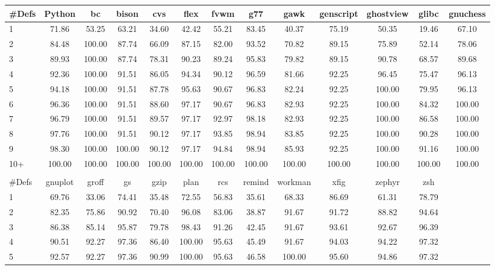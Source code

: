 \begin{tabular}{|l|c|c|c|c|c|c|c|c|c|c|c|c|}\hline
\#Defs & Python & bc & bison & cvs & flex & fvwm & g77 & gawk & genscript & ghostview & glibc & gnuchess\\\hline%
1  & 71.86 & 53.25 & 63.21 & 34.60 & 42.42 & 55.21 & 83.45 & 40.37 & 75.19 & 50.35 & 19.46 & 67.10\\\hline
2  & 84.48 & 100.00 & 87.74 & 66.09 & 87.15 & 82.00 & 93.52 & 70.82 & 89.15 & 75.89 & 52.14 & 78.06\\\hline
3  & 89.93 & 100.00 & 87.74 & 78.31 & 90.23 & 89.24 & 95.83 & 79.82 & 89.15 & 90.78 & 68.57 & 89.68\\\hline
4  & 92.36 & 100.00 & 91.51 & 86.05 & 94.34 & 90.12 & 96.59 & 81.66 & 92.25 & 96.45 & 75.47 & 96.13\\\hline
5  & 94.18 & 100.00 & 91.51 & 87.78 & 95.63 & 90.67 & 96.83 & 82.24 & 92.25 & 100.00 & 79.95 & 96.13\\\hline
6  & 96.36 & 100.00 & 91.51 & 88.60 & 97.17 & 90.67 & 96.83 & 82.93 & 92.25 & 100.00 & 84.32 & 100.00\\\hline
7  & 96.79 & 100.00 & 91.51 & 89.57 & 97.17 & 92.97 & 98.18 & 82.93 & 92.25 & 100.00 & 86.58 & 100.00\\\hline
8  & 97.76 & 100.00 & 91.51 & 90.12 & 97.17 & 93.85 & 98.94 & 83.85 & 92.25 & 100.00 & 90.28 & 100.00\\\hline
9  & 98.30 & 100.00 & 100.00 & 90.12 & 97.17 & 94.84 & 98.94 & 85.93 & 92.25 & 100.00 & 91.16 & 100.00\\\hline
10+ & 100.00 & 100.00 & 100.00 & 100.00 & 100.00 & 100.00 & 100.00 & 100.00 & 100.00 & 100.00 & 100.00 & 100.00\\\hline
\multicolumn{12}{c}{} \\
\cline{0-11}
\#Defs & gnuplot & groff & gs & gzip & plan & rcs & remind & workman & xfig & zephyr & zsh\\\cline{0-11}\cline{0-11}
1  & 69.76 & 33.06 & 74.41 & 35.48 & 72.55 & 56.83 & 35.61 & 68.33 & 86.69 & 61.31 & 78.79\\\cline{0-11}
2  & 82.35 & 75.86 & 90.92 & 70.40 & 96.08 & 83.06 & 38.87 & 91.67 & 91.72 & 88.82 & 94.64\\\cline{0-11}
3  & 86.38 & 85.14 & 95.87 & 79.78 & 98.43 & 91.26 & 42.45 & 91.67 & 93.61 & 92.67 & 96.39\\\cline{0-11}
4  & 90.51 & 92.27 & 97.36 & 86.40 & 100.00 & 95.63 & 45.49 & 91.67 & 94.03 & 94.22 & 97.32\\\cline{0-11}
5  & 92.57 & 92.27 & 97.36 & 90.99 & 100.00 & 95.63 & 46.58 & 100.00 & 95.60 & 94.86 & 97.32\\\cline{0-11}

\end{tabular}
